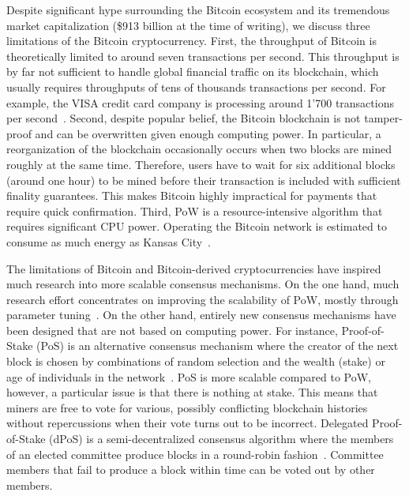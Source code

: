 Despite significant hype surrounding the Bitcoin ecosystem and its tremendous market capitalization (\$913 billion at the time of writing), we discuss three limitations of the Bitcoin cryptocurrency.
First, the throughput of Bitcoin is theoretically limited to around seven transactions per second.
This throughput is by far not sufficient to handle global financial traffic on its blockchain, which usually requires throughputs of tens of thousands transactions per second.
For example, the VISA credit card company is processing around 1'700 transactions per second~\cite{sedgwick2018no}.
Second, despite popular belief, the Bitcoin blockchain is not tamper-proof and can be overwritten given enough computing power.
In particular, a reorganization of the blockchain occasionally occurs when two blocks are mined roughly at the same time.
Therefore, users have to wait for six additional blocks (around one hour) to be mined before their transaction is included with sufficient finality guarantees.
This makes Bitcoin highly impractical for payments that require quick confirmation.
Third, PoW is a resource-intensive algorithm that requires significant CPU power.
Operating the Bitcoin network is estimated to consume as much energy as Kansas City~\cite{stoll2019carbon}.

The limitations of Bitcoin and Bitcoin-derived cryptocurrencies have inspired much research into more scalable consensus mechanisms.
On the one hand, much research effort concentrates on improving the scalability of PoW, mostly through parameter tuning~\cite{karame2016security}.
On the other hand, entirely new consensus mechanisms have been designed that are not based on computing power.
For instance, Proof-of-Stake (PoS) is an alternative consensus mechanism where the creator of the next block is chosen by combinations of random selection and the wealth (stake) or age of individuals in the network~\cite{king2012ppcoin}.
PoS is more scalable compared to PoW, however, a particular issue is that there is nothing at stake.
This means that miners are free to vote for various, possibly conflicting blockchain histories without repercussions when their vote turns out to be incorrect.
Delegated Proof-of-Stake (dPoS) is a semi-decentralized consensus algorithm where the members of an elected committee produce blocks in a round-robin fashion~\cite{larimer2014delegated}.
Committee members that fail to produce a block within time can be voted out by other members.

